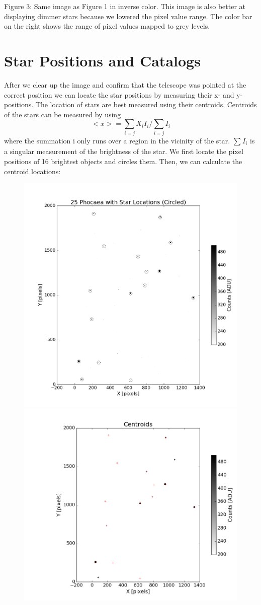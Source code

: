\documentclass[onecolumn, 12pt, a4paper]{article}
\begin{document}
Figure 3: Same image as Figure 1 in inverse color. This image is also better at displaying dimmer stars because we lowered the pixel value range. The color bar on the right shows the range of pixel values mapped to grey levels.
\newline

\section{Star Positions and Catalogs}
After we clear up the image and confirm that the telescope was pointed at the correct position we can locate the star positions by measuring their x- and y-positions. The location of stars are best measured using their centroids. Centroids of the stars can be measured by using \newline
\begin{equation}\label{eq:1}
<x> = \sum_{i=j}{X_i I_i }/ \sum_{i=j}{I_i}
\end{equation}
\leavevmode
\newline
where the summation i only runs over a region in the vicinity of the star. $\sum_{}{I_i}$ is a singular measurement of the brightness of the star. We first locate the pixel positions of 16 brightest objects and circles them. Then, we can calculate the centroid locations:

\begin{subfigure}{\linewidth}\hspace*{-2.5cm}
  \includegraphics[width=.56\linewidth]{figure_2.png}
  \includegraphics[width=.64\linewidth]{figure_1-4.png}
  \end{subfigure}\par\medskip
\end{document}
